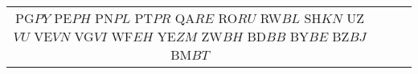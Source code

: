 \begin{tabular}{ c | c | c | c | }
PG$ %
PY$ %
PE$ %
PH$ %
PN$ %
PL$ %
PT$ %
PR$ %
QA$ %
RE$ %
RO$ %
RU$ %
RW$ %
BL$ %
SH$ %
KN$ %
UZ$ %
VU$ %
VE$ %
VN$ %
VG$ %
VI$ %
WF$ %
EH$ %
YE$ %
ZM$ %
ZW$ %
BH$ %
BD$ %
BB$ %
BY$ %
BE$ %
BZ$ %
BJ$ %
BM$ %
BT$ %

\end{tabular}
